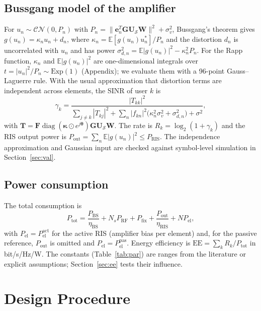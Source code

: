 \documentclass{ieeeaccess}
\newcommand{\E}{\mathbb{E}}
\newcommand{\CN}{\mathcal{CN}}
\newcommand{\diag}{\operatorname{diag}}
\begin{document}
\subsection{Bussgang model of the amplifier}
For $u_n\sim\CN(0,P_n)$ with $P_n=\|\mathbf e_n^T\mathbf G\mathbf U_{\mathcal S}\mathbf W\|^2+\sigma_v^2$, Bussgang's theorem \cite{buss1952} gives $g(u_n)=\kappa_n u_n+d_n$, where $\kappa_n=\E[g(u_n)u_n^*]/P_n$ and the distortion $d_n$ is uncorrelated with $u_n$ and has power $\sigma_{d,n}^2=\E|g(u_n)|^2-\kappa_n^2P_n$. For the Rapp function, $\kappa_n$ and $\E|g(u_n)|^2$ are one-dimensional integrals over $t=|u_n|^2/P_n\sim\mathrm{Exp}(1)$ (Appendix); we evaluate them with a 96-point Gauss--Laguerre rule. With the usual approximation that distortion terms are independent across elements, the SINR of user $k$ is
\begin{equation}
\gamma_k=\frac{|T_{kk}|^2}{\sum_{j\ne k}|T_{kj}|^2+\sum_n|f_{kn}|^2\bigl(\kappa_n^2\sigma_v^2+\sigma_{d,n}^2\bigr)+\sigma^2},\label{eq:sinr}
\end{equation}
with $\mathbf T=\mathbf F\diag(\boldsymbol\kappa\odot e^{j\boldsymbol\theta})\mathbf G\mathbf U_{\mathcal S}\mathbf W$. The rate is $R_k=\log_2(1+\gamma_k)$ and the RIS output power is $P_\mathrm{out}=\sum_n\E|g(u_n)|^2\le P_\mathrm{RIS}$. The independence approximation and Gaussian input are checked against symbol-level simulation in Section~\ref{sec:val}.

\subsection{Power consumption}
The total consumption is
\begin{equation}
P_\mathrm{tot}=\frac{P_\mathrm{BS}}{\eta_\mathrm{BS}}+N_sP_\mathrm{RF}+P_\mathrm{fix}+\frac{P_\mathrm{out}}{\eta_\mathrm{RIS}}+N P_\mathrm{el},\label{eq:power}
\end{equation}
with $P_\mathrm{el}=P_\mathrm{el}^\mathrm{act}$ for the active RIS (amplifier bias per element) and, for the passive reference, $P_\mathrm{out}$ is omitted and $P_\mathrm{el}=P_\mathrm{el}^\mathrm{pas}$. Energy efficiency is $\mathrm{EE}=\sum_kR_k/P_\mathrm{tot}$ in bit/s/Hz/W. The constants (Table~\ref{tab:par}) are ranges from the literature or explicit assumptions; Section~\ref{sec:ee} tests their influence.

\section{Design Procedure}\label{sec:des}
\end{document}
